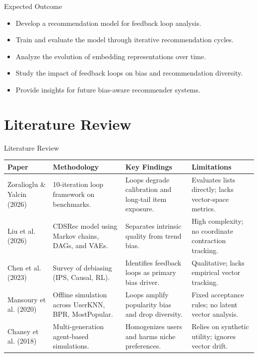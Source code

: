 \documentclass[11pt,aspectratio=43]{beamer}
\newcommand{\strong}[1]{\textbf{#1}}
\begin{document}
\begin{frame}{Expected Outcome}
\begin{itemize}
    \item Develop a recommendation model for feedback loop analysis.
    \item Train and evaluate the model through iterative recommendation cycles.
    \item Analyze the evolution of embedding representations over time.
    \item Study the impact of feedback loops on bias and recommendation diversity.
    \item Provide insights for future bias-aware recommender systems.
\end{itemize}
\end{frame}

\section{Literature Review}

\begin{frame}{Literature Review}
\scriptsize
\setlength{\tabcolsep}{1.5pt}
\renewcommand{\arraystretch}{1.05}
\begin{tabularx}{\textwidth}{L{1.8cm} Z Z Z}
\toprule
\strong{Paper} & \strong{Methodology} & \strong{Key Findings} & \strong{Limitations} \\
\midrule
Zoralioglu \& Yalcin (2026) & 10-iteration loop framework on benchmarks. & Loops degrade calibration and long-tail item exposure. & Evaluates lists directly; lacks vector-space metrics. \\
\midrule
Liu et al. (2026) & CDSRec model using Markov chains, DAGs, and VAEs. & Separates intrinsic quality from trend bias. & High complexity; no coordinate contraction tracking. \\
\midrule
Chen et al. (2023) & Survey of debiasing (IPS, Causal, RL). & Identifies feedback loops as primary bias driver. & Qualitative; lacks empirical vector tracking. \\
\midrule
Mansoury et al. (2020) & Offline simulation across UserKNN, BPR, MostPopular. & Loops amplify popularity bias and drop diversity. & Fixed acceptance rules; no latent vector analysis. \\
\midrule
Chaney et al. (2018) & Multi-generation agent-based simulations. & Homogenizes users and harms niche preferences. & Relies on synthetic utility; ignores vector drift. \\
\bottomrule
\end{tabularx}
\end{frame}
\end{document}
